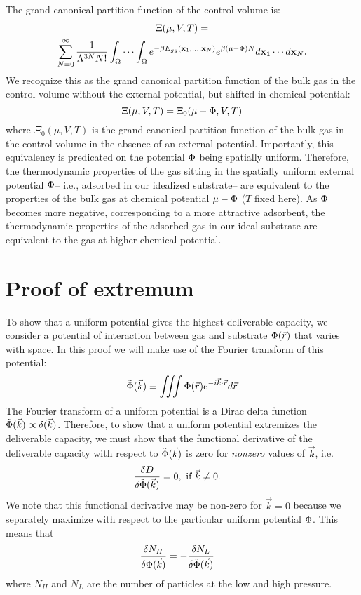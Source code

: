The grand-canonical partition function of the control volume is:
\begin{multline}
    \Xi(\mu, V, T)= \\ \displaystyle \sum_{N=0}^\infty \frac{1}{\Lambda^{3N}N!} \int_{\Omega} \cdots \int_{\Omega} e^{-\beta E_{gg}(\mathbf{x}_1, ..., \mathbf{x}_N)} e^{\beta (\mu - \Phi) N} d\mathbf{x}_1 \cdots d\mathbf{x}_N.
    \label{eq:gcpf}
\end{multline} We recognize this as the grand canonical partition function of the bulk gas in the control volume without the external potential, but shifted in chemical potential:
\begin{equation}
    \Xi(\mu, V, T)=\Xi_0(\mu - \Phi, V, T)
    \label{eq:xi_vs_xi0}
\end{equation}
where $\Xi_0(\mu, V, T)$ is the grand-canonical partition function of the bulk gas in the control volume in the absence of an external potential. Importantly, this equivalency is predicated on the potential $\Phi$ being spatially uniform. Therefore, the thermodynamic properties of the gas sitting in the spatially uniform external potential $\Phi$-- i.e., adsorbed in our idealized substrate-- are equivalent to the properties of the bulk gas at chemical potential $\mu-\Phi$ ($T$ fixed here). 
As $\Phi$ becomes more negative, corresponding to a more attractive adsorbent, the thermodynamic properties of the adsorbed gas in our ideal substrate are equivalent to the gas at higher chemical potential.

\section{Proof of extremum}\label{sec:proof-extremum}
To show that a uniform potential gives the highest deliverable capacity, we consider a potential of interaction between gas and substrate $\Phi(\vec r)$ that varies with space.  In this proof we will make use of the Fourier transform of this potential:
\begin{align}
    \tilde\Phi(\vec k) \equiv \iiint \Phi(\vec r) e^{-i\vec k\cdot \vec r} d\vec r
\end{align}
The Fourier transform of a uniform potential is a Dirac delta function $\tilde{\Phi}(\vec k)\propto\delta(\vec k)$. Therefore, to show that a uniform potential extremizes the deliverable capacity, we must show that the functional derivative of the deliverable capacity with respect to $\tilde\Phi(\vec k)$ is zero for \emph{nonzero} values of $\vec k$, i.e.
\begin{align}
    \frac{\delta D}{\delta \tilde\Phi(\vec k)} &= 0, \text{ if } \vec k\ne 0.
\end{align}
We note that this functional derivative may be non-zero for $\vec k=0$ because we separately maximize with respect to the particular uniform potential $\Phi$.
This means that
\begin{align}
    \frac{\delta N_H}{\delta \Phi(\vec k)} &= -\frac{\delta N_L}{\delta \tilde\Phi(\vec k)}
\end{align}
where $N_H$ and $N_L$ are the number of particles at the low and high pressure.

